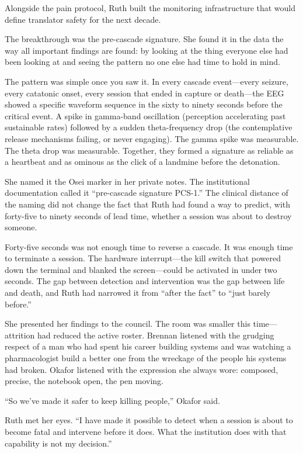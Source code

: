 \scenebreak

Alongside the pain protocol, Ruth built the monitoring infrastructure that would define translator safety for the next decade.

The breakthrough was the pre-cascade signature. She found it in the data the way all important findings are found: by looking at the thing everyone else had been looking at and seeing the pattern no one else had time to hold in mind.

The pattern was simple once you saw it. In every cascade event---every seizure, every catatonic onset, every session that ended in capture or death---the EEG showed a specific waveform sequence in the sixty to ninety seconds before the critical event. A spike in gamma-band oscillation (perception accelerating past sustainable rates) followed by a sudden theta-frequency drop (the contemplative release mechanisms failing, or never engaging). The gamma spike was measurable. The theta drop was measurable. Together, they formed a signature as reliable as a heartbeat and as ominous as the click of a landmine before the detonation.

She named it the Osei marker in her private notes. The institutional documentation called it ``pre-cascade signature PCS-1.'' The clinical distance of the naming did not change the fact that Ruth had found a way to predict, with forty-five to ninety seconds of lead time, whether a session was about to destroy someone.

Forty-five seconds was not enough time to reverse a cascade. It was enough time to terminate a session. The hardware interrupt---the kill switch that powered down the terminal and blanked the screen---could be activated in under two seconds. The gap between detection and intervention was the gap between life and death, and Ruth had narrowed it from ``after the fact'' to ``just barely before.''

She presented her findings to the council. The room was smaller this time---attrition had reduced the active roster. Brennan listened with the grudging respect of a man who had spent his career building systems and was watching a pharmacologist build a better one from the wreckage of the people his systems had broken. Okafor listened with the expression she always wore: composed, precise, the notebook open, the pen moving.

``So we've made it safer to keep killing people,'' Okafor said.

Ruth met her eyes. ``I have made it possible to detect when a session is about to become fatal and intervene before it does. What the institution does with that capability is not my decision.''

